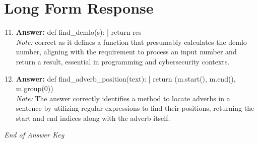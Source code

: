 \documentclass[12pt]{article}
\begin{document}
\section*{Long Form Response}
\begin{enumerate}[label=\arabic*.]
\setcounter{enumi}{10}
\item \textbf{Answer:} def find\_demlo(s): | return res
\\ \textit{Note:} correct as it defines a function that presumably calculates the demlo number, aligning with the requirement to process an input number and return a result, essential in programming and cybersecurity contexts.
\item \textbf{Answer:} def find\_adverb\_position(text): | return (m.start(), m.end(), m.group(0))
\\ \textit{Note:} The answer correctly identifies a method to locate adverbs in a sentence by utilizing regular expressions to find their positions, returning the start and end indices along with the adverb itself.
\end{enumerate}

\vfill
\noindent\textit{End of Answer Key}
\end{document}
